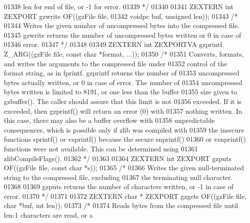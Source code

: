 \begin{DoxyCode}
01338 \textcolor{comment}{   len for end of file, or -1 for error.}
01339 \textcolor{comment}{*/}
01340 
01341 ZEXTERN \textcolor{keywordtype}{int} ZEXPORT gzwrite OF((gzFile file,
01342                                 voidpc buf, \textcolor{keywordtype}{unsigned} len));
01343 \textcolor{comment}{/*}
01344 \textcolor{comment}{     Writes the given number of uncompressed bytes into the compressed file.}
01345 \textcolor{comment}{   gzwrite returns the number of uncompressed bytes written or 0 in case of}
01346 \textcolor{comment}{   error.}
01347 \textcolor{comment}{*/}
01348 
01349 ZEXTERN \textcolor{keywordtype}{int} ZEXPORTVA gzprintf Z\_ARG((gzFile file, \textcolor{keyword}{const} \textcolor{keywordtype}{char} *format, ...));
01350 \textcolor{comment}{/*}
01351 \textcolor{comment}{     Converts, formats, and writes the arguments to the compressed file under}
01352 \textcolor{comment}{   control of the format string, as in fprintf.  gzprintf returns the number of}
01353 \textcolor{comment}{   uncompressed bytes actually written, or 0 in case of error.  The number of}
01354 \textcolor{comment}{   uncompressed bytes written is limited to 8191, or one less than the buffer}
01355 \textcolor{comment}{   size given to gzbuffer().  The caller should assure that this limit is not}
01356 \textcolor{comment}{   exceeded.  If it is exceeded, then gzprintf() will return an error (0) with}
01357 \textcolor{comment}{   nothing written.  In this case, there may also be a buffer overflow with}
01358 \textcolor{comment}{   unpredictable consequences, which is possible only if zlib was compiled with}
01359 \textcolor{comment}{   the insecure functions sprintf() or vsprintf() because the secure snprintf()}
01360 \textcolor{comment}{   or vsnprintf() functions were not available.  This can be determined using}
01361 \textcolor{comment}{   zlibCompileFlags().}
01362 \textcolor{comment}{*/}
01363 
01364 ZEXTERN \textcolor{keywordtype}{int} ZEXPORT gzputs OF((gzFile file, \textcolor{keyword}{const} \textcolor{keywordtype}{char} *s));
01365 \textcolor{comment}{/*}
01366 \textcolor{comment}{     Writes the given null-terminated string to the compressed file, excluding}
01367 \textcolor{comment}{   the terminating null character.}
01368 \textcolor{comment}{}
01369 \textcolor{comment}{     gzputs returns the number of characters written, or -1 in case of error.}
01370 \textcolor{comment}{*/}
01371 
01372 ZEXTERN \textcolor{keywordtype}{char} * ZEXPORT gzgets OF((gzFile file, \textcolor{keywordtype}{char} *buf, \textcolor{keywordtype}{int} len));
01373 \textcolor{comment}{/*}
01374 \textcolor{comment}{     Reads bytes from the compressed file until len-1 characters are read, or a}

\end{DoxyCode}
